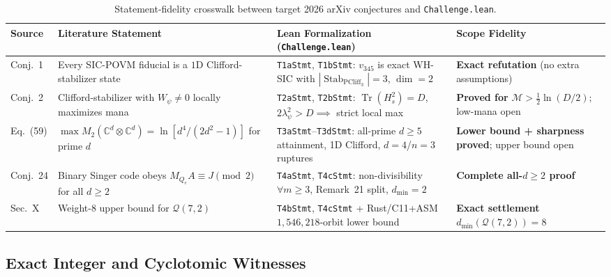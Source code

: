 \documentclass[11pt,letterpaper]{article}
\theoremstyle{plain}
\theoremstyle{definition}
\theoremstyle{remark}
\newcommand{\C}{\mathbb{C}}
\newcommand{\Tr}{\operatorname{Tr}}
\newcommand{\Stab}{\operatorname{Stab}}
\newcommand{\PCliff}{\mathrm{PCliff}}
\newcommand{\Qcode}{\mathcal{Q}}
\newcommand{\Mana}{\mathcal{M}}
\newcommand{\leanref}[1]{\textnormal{\texttt{\footnotesize #1}}}
\begin{document}
\begin{table}[h]
\centering
\caption{Statement-fidelity crosswalk between target 2026 arXiv conjectures and \texttt{Challenge.lean}.}
\label{tab:fidelity}
\footnotesize
\begin{tabularx}{\textwidth}{@{}llLL@{}}
\toprule
\textbf{Source} & \textbf{Literature Statement} & \textbf{Lean Formalization (\texttt{Challenge.lean})} & \textbf{Scope Fidelity} \\
\midrule
\cite{ErewGoldstein2026} Conj.~1 & Every SIC-POVM fiducial is a $1$D Clifford-stabilizer state & \leanref{T1aStmt}, \leanref{T1bStmt}: $v_{345}$ is exact WH-SIC with $|\Stab_{\PCliff_3}|=3$, $\dim=2$ & \textbf{Exact refutation} (no extra assumptions) \\
\cite{ErewGoldstein2026} Conj.~2 & Clifford-stabilizer with $W_\psi\neq 0$ locally maximizes mana & \leanref{T2aStmt}, \leanref{T2bStmt}: $\Tr(H_s^2)=D$, $2\lambda_\psi^2>D\implies$ strict local max & \textbf{Proved for} $\Mana>\tfrac{1}{2}\ln(D/2)$; low-mana open \\
\cite{Knipfer2026} Eq.~(59) & $\max M_2(\C^d\otimes\C^d)=\ln[d^4/(2d^2-1)]$ for prime $d$ & \leanref{T3aStmt}--\leanref{T3dStmt}: all-prime $d\ge 5$ attainment, 1D Clifford, $d=4$/$n=3$ ruptures & \textbf{Lower bound + sharpness proved}; upper bound open \\
\cite{KulhandjianHanzo2026} Conj.~24 & Binary Singer code obeys $M_{Q_e}A\equiv J\pmod 2$ for all $d\ge 2$ & \leanref{T4aStmt}, \leanref{T4cStmt}: non-divisibility $\forall m\ge 3$, Remark~21 split, $d_{\min}=2$ & \textbf{Complete all-$d\ge 2$ proof} \\
\cite{KulhandjianHanzo2026} Sec.~X & Weight-$8$ upper bound for $\Qcode(7,2)$ & \leanref{T4bStmt}, \leanref{T4cStmt} + Rust/C11+ASM $1{,}546{,}218$-orbit lower bound & \textbf{Exact settlement} $d_{\min}(\Qcode(7,2))=8$ \\
\bottomrule
\end{tabularx}
\end{table}

\subsection{Exact Integer and Cyclotomic Witnesses}
\end{document}
